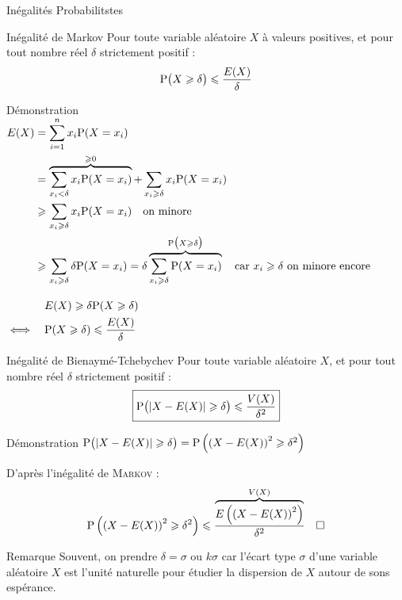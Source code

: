 \documentclass{coursbook}
\begin{document}
    \begin{Gpartie}{Inégalités Probabilitstes} 
        \begin{Spartie}{Inégalité de Markov} 
            Pour toute variable aléatoire $X$ à valeurs positives, et pour tout nombre réel $\delta$ strictement positif : \[\Pde\big(X\geq\delta\big)\leq\frac{E(X)}{\delta}\]
            \begin{SSpartie}{Démonstration} 
                $\begin{aligned}[t]
                    E(X) &= \sum_{i=1}^n x_i\mathrm{P}(X=x_i) \\
                    &= \overbrace{\sum_{x_i<\delta} x_i\mathrm{P}(X=x_i)}^{\geqslant0} + \sum_{x_i\geqslant\delta} x_i\mathrm{P}(X=x_i) \\
                    &\geqslant\sum_{x_i\geqslant\delta} x_i\mathrm{P}(X=x_i)\quad\text{on minore}\\
                    &\geqslant\sum_{x_i\geqslant\delta} \delta\mathrm{P}(X=x_i)=\delta\overbrace{\sum_{x_i\geqslant\delta}\mathrm{P}(X=x_i)}^{\mathrm{P}\big(X\geqslant\delta\big)}\quad\text{car $x_i\geqslant\delta$ on minore encore}
                \end{aligned}$

                $\begin{aligned}[t]
                    &\quad E(X)\geq\delta\Pde(X\geq\delta) \\
                    \iff&\quad \Pde(X\geq\delta)\leq\frac{E(X)}{\delta}
                \end{aligned}$
            \end{SSpartie}
        \end{Spartie}
        \begin{Spartie}{Inégalité de Bienaymé-Tchebychev} 
            Pour toute variable aléatoire $X$, et pour tout nombre réel $\delta$ strictement positif : \[\boxed{\Pde\big(\lvert X-E(X)\rvert\geq\delta\big)\leq\frac{V(X)}{\delta^2}}\]
            \begin{SSpartie}{Démonstration} 
                $\mathrm{P}\big(\lvert X-E(X)\rvert\geqslant\delta\big)=\mathrm{P}\left(\left(X-E(X)\right)^2\geqslant\delta^2\right)$

                D'après l'inégalité de \textsc{Markov} : \[\Pde\left(\left(X-E(X)\right)^2\geq\delta^2\right)\leq\frac{\overbrace{E\left(\left(X-E(X)\right)^2\right)}^{V(X)}}{\delta^2}\quad\square\]
            \end{SSpartie}
        \end{Spartie}
        \begin{Spartie}{Remarque} 
            Souvent, on prendre $\delta=\sigma$ ou $k\sigma$ car l'écart type $\sigma$ d'une variable aléatoire $X$ est l'unité naturelle pour étudier la dispersion de $X$ autour de sons espérance.


\end{Spartie}
\end{Gpartie}
\end{document}
